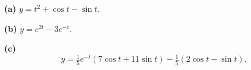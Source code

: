 \noindent\textbf{(a)} \(y=t^2+\cos t-\sin t\).

\noindent\textbf{(b)} \(y=e^{2t}-3e^{-t}\).

\noindent\textbf{(c)} \[y=\tfrac15e^{-t}(7\cos t+11\sin t)-\tfrac15(2\cos t-\sin t).\]
